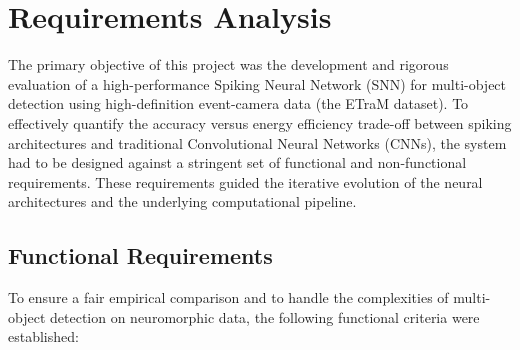 \section{Requirements Analysis}
\label{sec:requirements}

The primary objective of this project was the development and rigorous evaluation of a high-performance Spiking Neural Network (SNN) for multi-object detection using high-definition event-camera data (the ETraM dataset). To effectively quantify the accuracy versus energy efficiency trade-off between spiking architectures and traditional Convolutional Neural Networks (CNNs), the system had to be designed against a stringent set of functional and non-functional requirements. These requirements guided the iterative evolution of the neural architectures and the underlying computational pipeline.

\subsection{Functional Requirements}
\label{subsec:req_functional}

To ensure a fair empirical comparison and to handle the complexities of multi-object detection on neuromorphic data, the following functional criteria were established:

